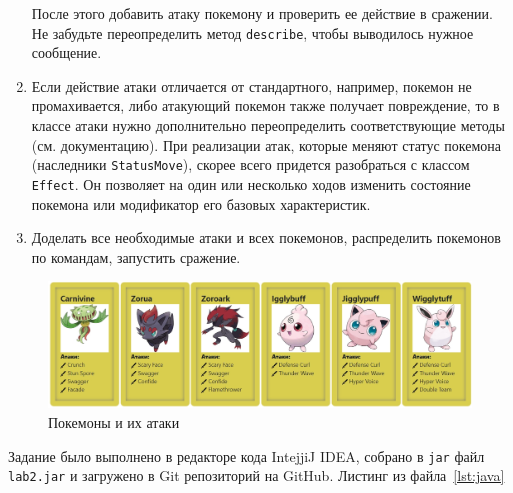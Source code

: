 \begin{enumerate}
        После этого добавить атаку покемону и проверить ее действие в сражении.
        Не забудьте переопределить метод \verb|describe|, чтобы выводилось нужное сообщение.
        \item Если действие атаки отличается от стандартного, например, покемон не промахивается, либо атакующий покемон также получает повреждение, то в классе атаки нужно дополнительно переопределить соответствующие методы (см.
        документацию).
        При реализации атак, которые меняют статус покемона (наследники \verb|StatusMove|), скорее всего придется разобраться с классом \verb|Effect|.
        Он позволяет на один или несколько ходов изменить состояние покемона или модификатор его базовых характеристик.
        \item Доделать все необходимые атаки и всех покемонов, распределить покемонов по командам, запустить сражение.
    \end{enumerate}
    \begin{figure}[H] %
        \centering
        \includegraphics[width=\textwidth]{res/pokemons.jpeg}
        \caption{Покемоны и их атаки}
        \label{fig:enter-label}
    \end{figure}


    \newpage
    Задание было выполнено в редакторе кода IntejjiJ IDEA, собрано в \verb|jar| файл \verb|lab2.jar| и загружено в Git репозиторий на GitHub.
    Листинг из файла~\ref{lst:java}
    


